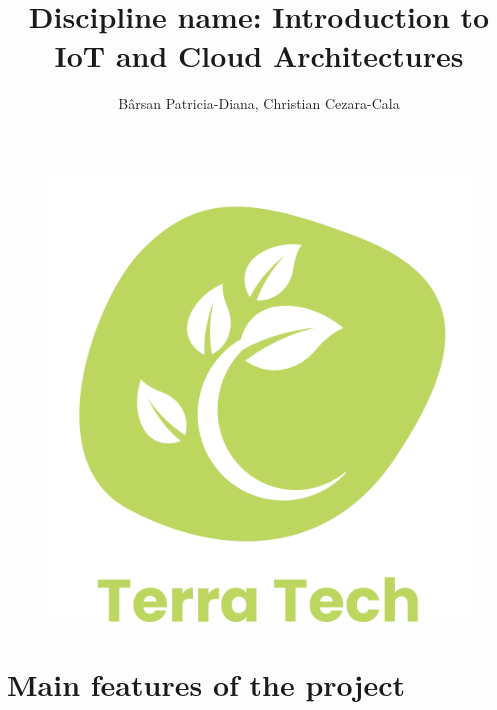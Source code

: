 \documentclass[12pt]{article}
\title{Discipline name: Introduction to IoT and Cloud Architectures}
\author{Bârsan Patricia-Diana, Christian Cezara-Cala}
\begin{document}

\begin{figure}
\centering
\includegraphics[width=0.8\linewidth]{images/image5.png}
\end{figure}

\maketitle

\newpage

\section{Main features of the project}
\end{document}
